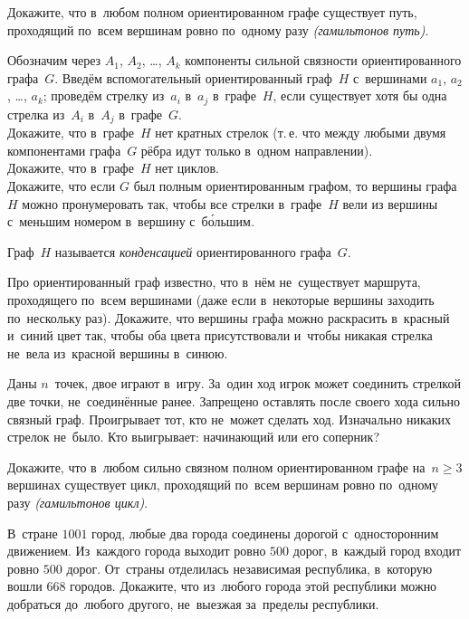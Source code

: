 \begin{problems}

\item
Докажите, что в~любом полном ориентированном графе существует путь, проходящий
по~всем вершинам ровно по~одному разу \emph{(гамильтонов путь)}.

\item
Обозначим через $A_{1}$, $A_{2}$, \ldots, $A_{k}$ компоненты сильной связности
ориентированного графа~$G$.
Введём вспомогательный ориентированный граф~$H$ с~вершинами
$a_{1}$, $a_{2}$, \ldots, $a_{k}$;
проведём стрелку из~$a_{i}$ в~$a_{j}$ в~графе~$H$, если существует хотя бы одна
стрелка из~$A_{i}$ в~$A_{j}$ в~графе~$G$.
\\
\subproblem
Докажите, что в~графе~$H$ нет кратных стрелок (т.\,е. что между любыми двумя
компонентами графа~$G$ рёбра идут только в~одном направлении).
\\
\subproblem
Докажите, что в~графе~$H$ нет циклов.
\\
\subproblem
Докажите, что если $G$ был полным ориентированным графом, то вершины графа~$H$
можно пронумеровать так, чтобы все стрелки в~графе~$H$ вели из вершины
с~меньшим номером в~вершину с~б\'{о}льшим.
\par
Граф~$H$ называется \emph{конденсацией} ориентированного графа~$G$.

\item
Про ориентированный граф известно, что в~нём не~существует маршрута,
проходящего по~всем вершинами
(даже если в~некоторые вершины заходить по~нескольку раз).
Докажите, что вершины графа можно раскрасить в~красный и~синий цвет так, чтобы
оба цвета присутствовали и~чтобы никакая стрелка не~вела из~красной вершины
в~синюю.

\item
Даны $n$~точек, двое играют в~игру.
За~один ход игрок может соединить стрелкой две точки, не~соединённые ранее.
Запрещено оставлять после своего хода сильно связный граф.
Проигрывает тот, кто не~может сделать ход.
Изначально никаких стрелок не~было.
Кто выигрывает: начинающий или его соперник?

\item
Докажите, что в~любом сильно связном полном ориентированном графе на~$n \geq 3$
вершинах существует цикл, проходящий по~всем вершинам ровно по~одному разу
\emph{(гамильтонов цикл)}.

\item
В~стране $1001$ город, любые два города соединены дорогой с~односторонним
движением.
Из~каждого города выходит ровно $500$ дорог, в~каждый город входит ровно
$500$ дорог.
От~страны отделилась независимая республика, в~которую вошли $668$ городов.
Докажите, что из~любого города этой республики можно добраться до~любого
другого, не~выезжая за~пределы республики.

\end{problems}

